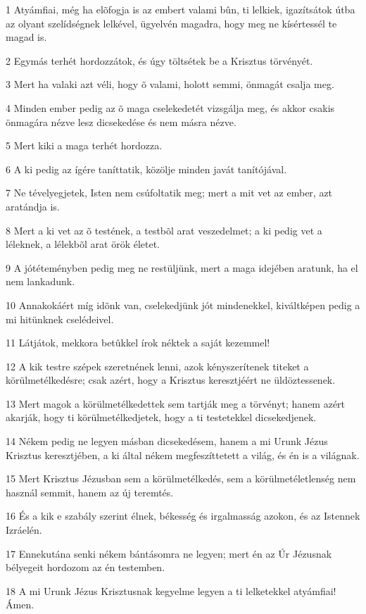 \par 1 Atyámfiai, még ha elõfogja is az embert valami bûn, ti lelkiek, igazítsátok útba az olyant szelídségnek lelkével, ügyelvén magadra, hogy meg ne kísértessél te magad is.
\par 2 Egymás terhét hordozzátok, és úgy töltsétek be a Krisztus törvényét.
\par 3 Mert ha valaki azt véli, hogy õ valami, holott semmi, önmagát csalja meg.
\par 4 Minden ember pedig az õ maga cselekedetét vizsgálja meg, és akkor csakis önmagára nézve lesz dicsekedése és nem másra nézve.
\par 5 Mert kiki a maga terhét hordozza.
\par 6 A ki pedig az ígére taníttatik, közölje minden javát tanítójával.
\par 7 Ne tévelyegjetek, Isten nem csúfoltatik meg; mert a mit vet az ember, azt aratándja is.
\par 8 Mert a ki vet az õ testének, a testbõl arat veszedelmet; a ki pedig vet a léleknek, a lélekbõl arat örök életet.
\par 9 A jótéteményben pedig meg ne restüljünk, mert a maga idejében aratunk, ha el nem lankadunk.
\par 10 Annakokáért míg idõnk van, cselekedjünk jót mindenekkel, kiváltképen pedig a mi hitünknek cselédeivel.
\par 11 Látjátok, mekkora betûkkel írok néktek a saját kezemmel!
\par 12 A kik testre szépek szeretnének lenni, azok kényszerítenek titeket a körülmetélkedésre; csak azért, hogy a Krisztus keresztjéért ne üldöztessenek.
\par 13 Mert magok a körülmetélkedettek sem tartják meg a törvényt; hanem azért akarják, hogy ti körülmetélkedjetek, hogy a ti testetekkel dicsekedjenek.
\par 14 Nékem pedig ne legyen másban dicsekedésem, hanem a mi Urunk Jézus Krisztus keresztjében, a ki által nékem megfeszíttetett a világ, és én is a világnak.
\par 15 Mert Krisztus Jézusban sem a körülmetélkedés, sem a körülmetéletlenség nem használ semmit, hanem az új teremtés.
\par 16 És a kik e szabály szerint élnek, békesség és irgalmasság azokon, és az Istennek Izráelén.
\par 17 Ennekutána senki nékem bántásomra ne legyen; mert én az Úr Jézusnak bélyegeit hordozom az én testemben.
\par 18 A mi Urunk Jézus Krisztusnak kegyelme legyen a ti lelketekkel atyámfiai! Ámen.


